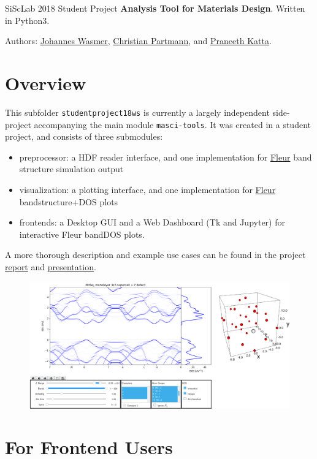\documentclass[]{article}
\date{}
\providecommand{\tightlist}{%
  \setlength{\itemsep}{0pt}\setlength{\parskip}{0pt}}
\begin{document}
SiScLab 2018 Student Project \textbf{Analysis Tool for Materials
Design}. Written in Python3.

Authors: \href{https://github.com/Irratzo}{Johannes Wasmer},
\href{https://github.com/ChristianPartmann}{Christian Partmann}, and
\href{https://github.com/PraneethKatta}{Praneeth Katta}.

\section{Overview}\label{overview}

This subfolder \texttt{studentproject18ws} is currently a largely
independent side-project accompanying the main module
\texttt{masci-tools}. It was created in a student project, and consists
of three submodules:

\begin{itemize}
\tightlist
\item
  preprocessor: a HDF reader interface, and one implementation for
  \href{http://www.judft.de}{Fleur} band structure simulation output
\item
  visualization: a plotting interface, and one implementation for
  \href{http://www.judft.de}{Fleur} bandstructure+DOS plots
\item
  frontends: a Desktop GUI and a Web Dashboard (Tk and Jupyter) for
  interactive Fleur bandDOS plots.
\end{itemize}

A more thorough description and example use cases can be found in the
project \href{./doc/report.pdf}{report} and
\href{./doc/presentation.pdf}{presentation}.

\begin{figure}
\centering
\includegraphics{./readme/web_frontend.png}
\caption{}
\end{figure}

\section{For Frontend Users}\label{for-frontend-users}
\end{document}
